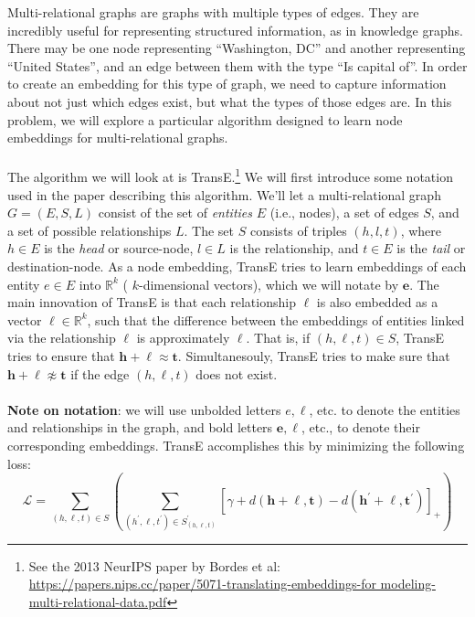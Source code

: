 \documentclass{article}
\numberwithin{figure}{section}
\begin{document}
\noindent Multi-relational graphs are graphs with multiple types of edges. They are incredibly useful for representing structured information, as in knowledge graphs. There may be one node representing “Washington, DC” and another representing “United States”, and an edge between them with the type “Is capital of”. In order to create an embedding for this type of graph, we need to capture information about not just which edges exist, but what the types of those edges are. In this problem, we will explore a particular algorithm designed to learn node embeddings for multi-relational graphs. \\\\
The algorithm we will look at is TransE.\footnote{See the 2013 NeurIPS paper by Bordes et al: \url{https://papers.nips.cc/paper/5071-translating-embeddings-for modeling-multi-relational-data.pdf}}
We will first introduce some notation used in the paper describing this algorithm.
We’ll let a multi-relational graph $G = (E, S, L)$ consist of the set of \textit{entities} $E$ (i.e., nodes), a set of edges $S$, and a set of possible relationships $L$.
The set $S$ consists of triples $(h, l, t)$, where $h \in E$ is the \textit{head} or source-node, $l \in L$ is the relationship, and $t \in E$ is the \textit{tail} or destination-node.
As a node embedding, TransE tries to learn embeddings of each entity $e \in E$ into $\mathbb{R}^k$ ( $k$-dimensional vectors), which we will notate by $\mathbf{e}$. The main innovation of TransE is that each relationship $\ell$ is also embedded as a vector $\ell \in \mathbb{R}^k$, such that the difference between the embeddings of entities linked via the relationship $\ell$ is approximately $\ell$. That is, if $(h, \ell, t) \in S$, TransE tries to ensure that $\mathbf{h}+\boldsymbol{\ell} \approx \mathbf{t}$. Simultanesouly, TransE tries to make sure that $\mathbf{h}+\boldsymbol{\ell} \not\approx \mathbf{t}$ if the edge $(h, \ell, t)$ does not exist.\\\\
\textbf{Note on notation}: we will use unbolded letters $e, \ell$, etc. to denote the entities and relationships in the graph, and bold letters $\mathbf{e}, \boldsymbol{\ell}$, etc., to denote their corresponding embeddings.
TransE accomplishes this by minimizing the following loss:
\begin{equation}\label{eq1}
\mathcal{L}=\sum_{(h, \ell, t) \in S}\left(\sum_{\left(h^{\prime}, \ell, t^{\prime}\right) \in S_{(h, \ell, t)}^{\prime}}\left[\gamma+d(\mathbf{h}+\boldsymbol{\ell}, \mathbf{t})-d\left(\mathbf{h}^{\prime}+\boldsymbol{\ell}, \mathbf{t}^{\prime}\right)\right]_{+}\right)
\end{equation}
\end{document}
